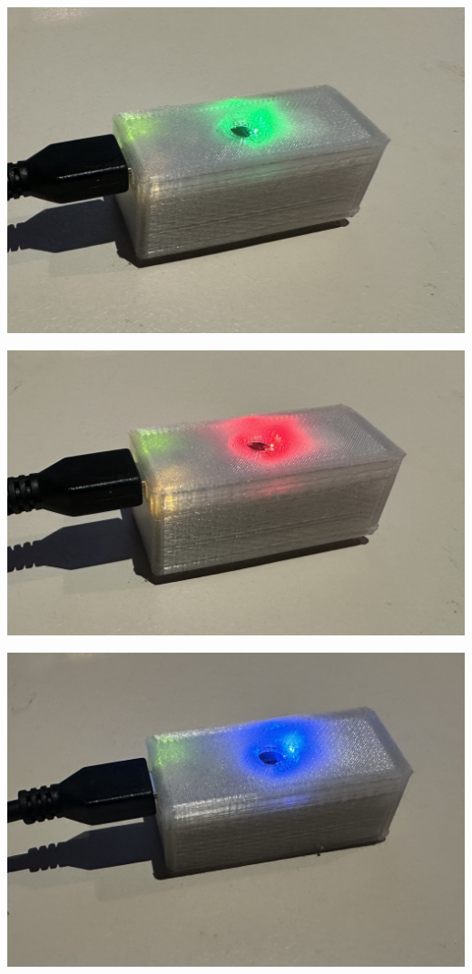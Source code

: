 \documentclass[25pt,a0paper, portrait]{tikzposter}
\begin{document}
\begin{columns}
{			\begin{tikzfigure}
				\begin{minipage}[b]{0.29\linewidth}
					\centering
					\includegraphics[width=\linewidth]{images/ArduinoGreen}
				\end{minipage}
				\hfill
				\begin{minipage}[b]{0.33\linewidth}
					\centering
					\includegraphics[width=\linewidth]{images/ArduinoRed}
				\end{minipage}
				\hfill
				\begin{minipage}[b]{0.3\linewidth}
					\centering
					\includegraphics[width=\linewidth]{images/ArduinoBlue}

\end{minipage}
\end{tikzfigure}}
\end{columns}
\end{document}
